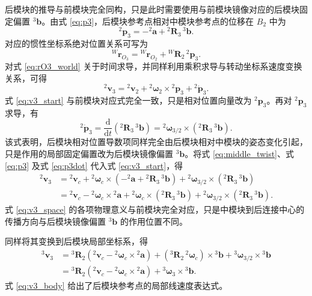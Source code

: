 后模块的推导与前模块完全同构，只是此时需要使用与前模块镜像对应的后模块固定偏置 ${}^{3}\mathbf b$。由式 \eqref{eq:p3}，后模块参考点相对中模块参考点的位移在 ${B_2}$ 中为
\begin{equation}
{}^{2}\mathbf p_3
=
-{}^{2}\mathbf a+{}^{2}\mathbf R_3\,{}^{3}\mathbf b.
\end{equation}
对应的惯性坐标系绝对位置关系可写为
\begin{equation}
{}^{W}\mathbf r_{O_3}
=
{}^{W}\mathbf r_{O_2}
+
{}^{W}\mathbf R_2\,{}^{2}\mathbf p_3.
\label{eq:rO3_world}
\end{equation}
对式 \eqref{eq:rO3_world} 关于时间求导，并同样利用乘积求导与转动坐标系速度变换关系，可得
\begin{equation}
{}^{2}\mathbf v_3
=
{}^{2}\mathbf v_2
+
{}^{2}\boldsymbol\omega_2\times {}^{2}\mathbf p_3
+
{}^{2}\dot{\mathbf p}_3.
\label{eq:v3_start}
\end{equation}
式 \eqref{eq:v3_start} 与前模块对应式完全一致，只是相对位置向量改为 ${}^{2}\mathbf p_3$。再对 ${}^{2}\mathbf p_3$ 求导，有
\begin{equation}
{}^{2}\dot{\mathbf p}_3
=
\frac{\mathrm d}{\mathrm dt}\left({}^{2}\mathbf R_3\,{}^{3}\mathbf b\right)
=
{}^{2}\boldsymbol\omega_{3/2}\times\left({}^{2}\mathbf R_3\,{}^{3}\mathbf b\right).
\label{eq:p3dot}
\end{equation}
该式表明，后模块相对位置导数项同样完全由后模块相对中模块的姿态变化引起，只是作用的局部固定偏置改为后模块镜像偏置 ${}^{3}\mathbf b$。将式 \eqref{eq:middle_twist}、式 \eqref{eq:p3} 及式 \eqref{eq:p3dot} 代入式 \eqref{eq:v3_start}，得
\begin{align}
{}^{2}\mathbf v_3
&=
{}^{2}\mathbf v_c
+
{}^{2}\boldsymbol\omega_c\times\left(-{}^{2}\mathbf a+{}^{2}\mathbf R_3\,{}^{3}\mathbf b\right)
+{}^{2}\boldsymbol\omega_{3/2}\times\left({}^{2}\mathbf R_3\,{}^{3}\mathbf b\right) \nonumber\\
&=
{}^{2}\mathbf v_c
-{}^{2}\boldsymbol\omega_c\times {}^{2}\mathbf a
+{}^{2}\boldsymbol\omega_c\times\left({}^{2}\mathbf R_3\,{}^{3}\mathbf b\right)
+{}^{2}\boldsymbol\omega_{3/2}\times\left({}^{2}\mathbf R_3\,{}^{3}\mathbf b\right).
\label{eq:v3_space}
\end{align}
式 \eqref{eq:v3_space} 的各项物理意义与前模块完全对应，只是中模块到后连接中心的传播方向与后模块镜像偏置 ${}^{3}\mathbf b$ 的作用位置不同。

同样将其变换到后模块局部坐标系，得
\begin{align}
{}^{3}\mathbf v_3
&=
{}^{3}\mathbf R_2\left({}^{2}\mathbf v_c-{}^{2}\boldsymbol\omega_c\times {}^{2}\mathbf a\right)
+
\left({}^{3}\mathbf R_2\,{}^{2}\boldsymbol\omega_c\right)\times {}^{3}\mathbf b
+
{}^{3}\boldsymbol\omega_{3/2}\times {}^{3}\mathbf b \nonumber\\
&=
{}^{3}\mathbf R_2\left({}^{2}\mathbf v_c-{}^{2}\boldsymbol\omega_c\times {}^{2}\mathbf a\right)
+{}^{3}\boldsymbol\omega_3\times {}^{3}\mathbf b.
\label{eq:v3_body}
\end{align}
式 \eqref{eq:v3_body} 给出了后模块参考点的局部线速度表达式。

